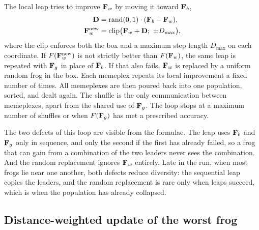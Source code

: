 The local leap tries to improve \(\mathbf{F}_{w}\) by moving it toward \(\mathbf{F}_{b}\),
\begin{equation}
\begin{aligned}
\vect{D}&=\mathrm{rand}(0,1)\cdot(\vect{F}_{b}-\vect{F}_{w}),\\
\vect{F}_{w}^{\mathrm{new}}&=\mathrm{clip}\bigl(\vect{F}_{w}+\vect{D};\ \pm D_{\max}\bigr),
\end{aligned}
\label{eq:leapb}
\end{equation}
where the clip enforces both the box and a maximum step length \(D_{\max}\) on each coordinate.
If \(F(\mathbf{F}_{w}^{\mathrm{new}})\) is not strictly better than \(F(\mathbf{F}_{w})\), the same leap is repeated with \(\mathbf{F}_{g}\) in place of \(\mathbf{F}_{b}\).
If that also fails, \(\mathbf{F}_{w}\) is replaced by a uniform random frog in the box.
Each memeplex repeats its local improvement a fixed number of times.
All memeplexes are then poured back into one population, sorted, and dealt again.
The shuffle is the only communication between memeplexes, apart from the shared use of \(\mathbf{F}_{g}\).
The loop stops at a maximum number of shuffles or when \(F(\mathbf{F}_{g})\) has met a prescribed accuracy.

The two defects of this loop are visible from the formulae.
The leap uses \(\mathbf{F}_{b}\) and \(\mathbf{F}_{g}\) only in sequence, and only the second if the first has already failed, so a frog that can gain from a combination of the two leaders never sees the combination.
And the random replacement ignores \(\mathbf{F}_{w}\) entirely.
Late in the run, when most frogs lie near one another, both defects reduce diversity: the sequential leap copies the leaders, and the random replacement is rare only when leaps succeed, which is when the population has already collapsed.

\subsection{Distance-weighted update of the worst frog}

